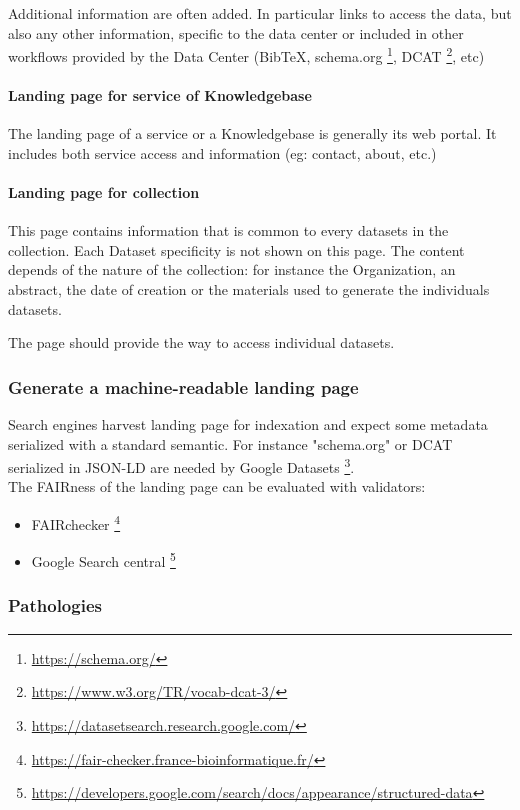 \documentclass[11pt,a4paper]{ivoa}
\begin{document}
Additional information are often added. In particular links to access the data, but also any other information, specific to the data center or included in other workflows provided by the Data Center (BibTeX, schema.org \footnote{\url{https://schema.org/}}, DCAT \footnote{\url{https://www.w3.org/TR/vocab-dcat-3/}}, etc)


\paragraph{Landing page for service of Knowledgebase}
The landing page of a service or a Knowledgebase is generally its web portal. It includes both service access and information (eg: contact, about, etc.)

\paragraph{Landing page for collection}
This page contains information that is common to every datasets in the collection. Each Dataset specificity is not shown on this page. The content depends of the nature of the collection: for instance the Organization, an abstract, the date of creation or the materials used to generate the individuals datasets.

The page should provide the way to access individual datasets.

\subsubsection{Generate a machine-readable landing page}
Search engines harvest landing page for indexation and expect some metadata serialized with a standard semantic. For instance "schema.org" or DCAT serialized in JSON-LD are needed by Google Datasets \footnote{\url{https://datasetsearch.research.google.com/}}.\\


The FAIRness of the landing page can be evaluated with validators:
\begin{itemize}
    \item FAIRchecker \footnote{\url{https://fair-checker.france-bioinformatique.fr/}}
    \item Google Search central \footnote{\url{https://developers.google.com/search/docs/appearance/structured-data}}
\end{itemize}


\subsubsection{Pathologies}
\end{document}
